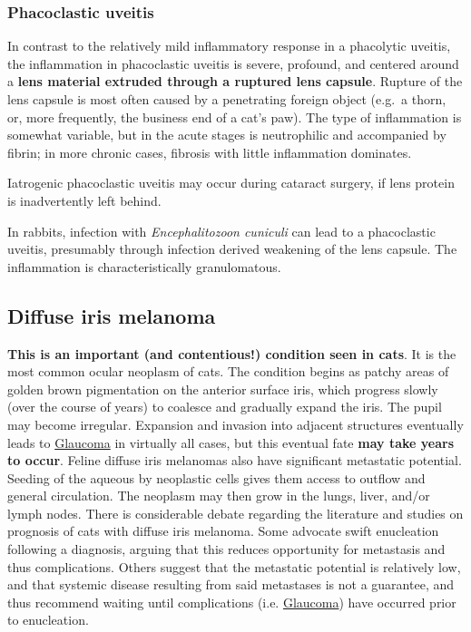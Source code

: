 \documentclass[openany]{article}
\begin{document}
\subsubsection{Phacoclastic uveitis}\label{phacoclastic-uveitis}

In contrast to the relatively mild inflammatory response in a phacolytic
uveitis, the inflammation in phacoclastic uveitis is severe, profound,
and centered around a \textbf{lens material extruded through a ruptured
lens capsule}. Rupture of the lens capsule is most often caused by a
penetrating foreign object (e.g.~a thorn, or, more frequently, the
business end of a cat's paw). The type of inflammation is somewhat
variable, but in the acute stages is neutrophilic and accompanied by
fibrin; in more chronic cases, fibrosis with little inflammation
dominates.

Iatrogenic phacoclastic uveitis may occur during cataract surgery, if
lens protein is inadvertently left behind.

In rabbits, infection with \emph{Encephalitozoon cuniculi} can lead to a
phacoclastic uveitis, presumably through infection derived weakening of
the lens capsule. The inflammation is characteristically granulomatous.

\hypertarget{diffuse-iris-melanoma}{\subsection{Diffuse iris
melanoma}\label{diffuse-iris-melanoma}}

\textbf{This is an important (and contentious!) condition seen in cats}.
It is the most common ocular neoplasm of cats. The condition begins as
patchy areas of golden brown pigmentation on the anterior surface iris,
which progress slowly (over the course of years) to coalesce and
gradually expand the iris. The pupil may become irregular. Expansion and
invasion into adjacent structures eventually leads to
\protect\hyperlink{glaucoma}{Glaucoma} in virtually all cases, but this
eventual fate \textbf{may take years to occur}. Feline diffuse iris
melanomas also have significant metastatic potential. Seeding of the
aqueous by neoplastic cells gives them access to outflow and general
circulation. The neoplasm may then grow in the lungs, liver, and/or
lymph nodes. There is considerable debate regarding the literature and
studies on prognosis of cats with diffuse iris melanoma. Some advocate
swift enucleation following a diagnosis, arguing that this reduces
opportunity for metastasis and thus complications. Others suggest that
the metastatic potential is relatively low, and that systemic disease
resulting from said metastases is not a guarantee, and thus recommend
waiting until complications (i.e.
\protect\hyperlink{glaucoma}{Glaucoma}) have occurred prior to
enucleation.
\end{document}
